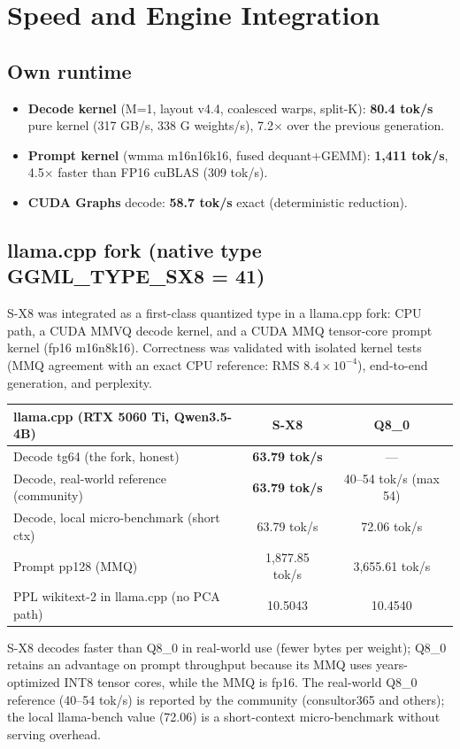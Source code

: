 \documentclass[11pt]{article}
\begin{document}
\section{Speed and Engine Integration}
\subsection{Own runtime}
\begin{itemize}
\item \textbf{Decode kernel} (M=1, layout v4.4, coalesced warps, split-K): \textbf{80.4 tok/s} pure kernel
(317 GB/s, 338 G weights/s), 7.2$\times$ over the previous generation.
\item \textbf{Prompt kernel} (wmma m16n16k16, fused dequant+GEMM): \textbf{1,411 tok/s}, 4.5$\times$ faster
than FP16 cuBLAS (309 tok/s).
\item \textbf{CUDA Graphs} decode: \textbf{58.7 tok/s} exact (deterministic reduction).
\end{itemize}
\subsection{llama.cpp fork (native type GGML\_TYPE\_SX8 = 41)}
S-X8 was integrated as a first-class quantized type in a llama.cpp fork: CPU path, a CUDA MMVQ decode
kernel, and a CUDA MMQ tensor-core prompt kernel (fp16 m16n8k16). Correctness was validated with isolated
kernel tests (MMQ agreement with an exact CPU reference: RMS $8.4\times10^{-4}$), end-to-end generation,
and perplexity.

\begin{center}
\begin{tabular}{lcc}
\toprule
llama.cpp (RTX 5060 Ti, Qwen3.5-4B) & \textbf{S-X8} & Q8\_0 \\
\midrule
Decode tg64 (the fork, honest) & \textbf{63.79 tok/s} & --- \\
Decode, real-world reference (community) & \textbf{63.79 tok/s} & 40--54 tok/s (max 54) \\
Decode, local micro-benchmark (short ctx) & 63.79 tok/s & 72.06 tok/s \\
Prompt pp128 (MMQ) & 1,877.85 tok/s & 3,655.61 tok/s \\
PPL wikitext-2 in llama.cpp (no PCA path) & 10.5043 & 10.4540 \\
\bottomrule
\end{tabular}
\end{center}
S-X8 decodes faster than Q8\_0 in real-world use (fewer bytes per weight); Q8\_0 retains an advantage on
prompt throughput because its MMQ uses years-optimized INT8 tensor cores, while the MMQ is fp16. The
real-world Q8\_0 reference (40--54 tok/s) is reported by the community (consultor365 and others); the
local llama-bench value (72.06) is a short-context micro-benchmark without serving overhead.
\end{document}
